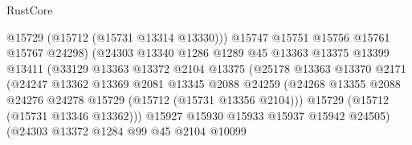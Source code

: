 \begin{lexlean}{RustCore}
\begin{coremodule}
                                      @15729
                                      (@15712 (@15731 @13314 @13330)))
                                    @15747
                                    @15751
                                    @15756
                                    @15761
                                    @15767
                                    @24298)
                                  (@24303
                                    @13340
                                    @1286
                                    @1289
                                    @45
                                    @13363
                                    @13375
                                    @13399
                                    @13411
                                    (@33129
                                      @13363
                                      @13372
                                      @2104
                                      @13375
                                      (@25178
                                        @13363
                                        @13370
                                        @2171
                                        (@24247
                                          @13362
                                          @13369
                                          @2081
                                          @13345
                                          @2088
                                          @24259
                                          (@24268
                                            @13355
                                            @2088
                                            @24276
                                            @24278
                                            @15729
                                            (@15712 (@15731 @13356 @2104)))
                                          @15729
                                          (@15712 (@15731 @13346 @13362)))
                                        @15927
                                        @15930
                                        @15933
                                        @15937
                                        @15942
                                        @24505)
                                      (@24303
                                        @13372
                                        @1284
                                        @99
                                        @45
                                        @2104
                                        @10099

\end{coremodule}
\end{lexlean}
